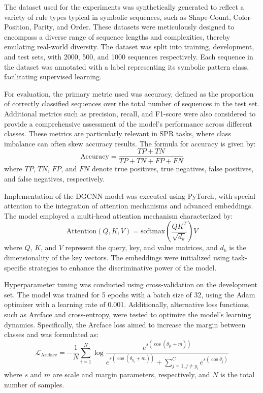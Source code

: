 \documentclass{article}
\begin{document}
The dataset used for the experiments was synthetically generated to reflect a variety of rule types typical in symbolic sequences, such as Shape-Count, Color-Position, Parity, and Order. These datasets were meticulously designed to encompass a diverse range of sequence lengths and complexities, thereby emulating real-world diversity. The dataset was split into training, development, and test sets, with 2000, 500, and 1000 sequences respectively. Each sequence in the dataset was annotated with a label representing its symbolic pattern class, facilitating supervised learning.

For evaluation, the primary metric used was accuracy, defined as the proportion of correctly classified sequences over the total number of sequences in the test set. Additional metrics such as precision, recall, and F1-score were also considered to provide a comprehensive assessment of the model's performance across different classes. These metrics are particularly relevant in SPR tasks, where class imbalance can often skew accuracy results. The formula for accuracy is given by:
\[
\text{Accuracy} = \frac{TP + TN}{TP + TN + FP + FN}
\]
where \( TP \), \( TN \), \( FP \), and \( FN \) denote true positives, true negatives, false positives, and false negatives, respectively.

Implementation of the DGCNN model was executed using PyTorch, with special attention to the integration of attention mechanisms and advanced embeddings. The model employed a multi-head attention mechanism characterized by:
\[
\text{Attention}(Q, K, V) = \text{softmax}\left(\frac{QK^T}{\sqrt{d_k}}\right)V
\]
where \( Q \), \( K \), and \( V \) represent the query, key, and value matrices, and \( d_k \) is the dimensionality of the key vectors. The embeddings were initialized using task-specific strategies to enhance the discriminative power of the model.

Hyperparameter tuning was conducted using cross-validation on the development set. The model was trained for 5 epochs with a batch size of 32, using the Adam optimizer with a learning rate of 0.001. Additionally, alternative loss functions, such as Arcface and cross-entropy, were tested to optimize the model's learning dynamics. Specifically, the Arcface loss aimed to increase the margin between classes and was formulated as:
\[
\mathcal{L}_{\text{Arcface}} = -\frac{1}{N}\sum_{i=1}^N \log \frac{e^{s (\cos(\theta_{y_i} + m))}}{e^{s (\cos(\theta_{y_i} + m))} + \sum_{j=1, j \neq y_i}^C e^{s (\cos \theta_j)}}
\]
where \( s \) and \( m \) are scale and margin parameters, respectively, and \( N \) is the total number of samples.
\end{document}
